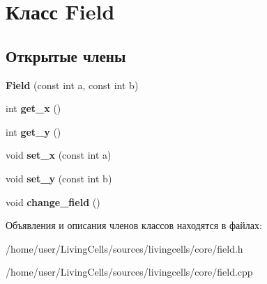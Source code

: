 \hypertarget{classField}{\section{Класс Field}
\label{classField}
}
\subsection*{Открытые члены}
\begin{DoxyCompactItemize}
\item 
\hypertarget{classField_aa667d9f9aa147e2e01d67622b20f9b8a}{{\bfseries Field} (const int a, const int b)}\label{classField_aa667d9f9aa147e2e01d67622b20f9b8a}

\item 
\hypertarget{classField_a87883594a355f7f8d5855a75a9c244ba}{int {\bfseries get\+\_\+x} ()}\label{classField_a87883594a355f7f8d5855a75a9c244ba}

\item 
\hypertarget{classField_a88d72b613ec5a84ed771b30c9332a2ee}{int {\bfseries get\+\_\+y} ()}\label{classField_a88d72b613ec5a84ed771b30c9332a2ee}

\item 
\hypertarget{classField_aabb859d9fe4221518a4e46a6a53e0ce3}{void {\bfseries set\+\_\+x} (const int a)}\label{classField_aabb859d9fe4221518a4e46a6a53e0ce3}

\item 
\hypertarget{classField_a44b4baffd21a4e55b4e13456068f1482}{void {\bfseries set\+\_\+y} (const int b)}\label{classField_a44b4baffd21a4e55b4e13456068f1482}

\item 
\hypertarget{classField_ae57a51289d5e0d36f273bfa282dd83d4}{void {\bfseries change\+\_\+field} ()}\label{classField_ae57a51289d5e0d36f273bfa282dd83d4}

\end{DoxyCompactItemize}


Объявления и описания членов классов находятся в файлах\+:\begin{DoxyCompactItemize}
\item 
/home/user/\+Living\+Cells/sources/livingcells/core/field.\+h\item 
/home/user/\+Living\+Cells/sources/livingcells/core/field.\+cpp\end{DoxyCompactItemize}
